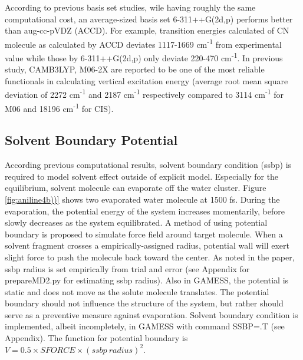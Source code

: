 \documentclass[
journal=jpcbfk, %
manuscript=article]{achemso}
\begin{document}
According to previous basis set studies, wile having roughly the same computational cost, an average-sized basis set 6-311++G(2d,p) performs better than aug-cc-pVDZ (ACCD).\cite{Wiberg2004,Barnes2014} For example, transition energies calculated of CN molecule as calculated by ACCD deviates 1117-1669 cm\textsuperscript{-1} from experimental value while those by 6-311++G(2d,p) only deviate 220-470 cm\textsuperscript{-1}. In previous study, CAMB3LYP, M06-2X are reported to be one of the most reliable functionals in calculating vertical excitation energy (average root mean square deviation of 2272 cm\textsuperscript{-1}  and 2187 cm\textsuperscript{-1}  respectively compared to 3114 cm\textsuperscript{-1} for M06 and 18196 cm\textsuperscript{-1} for CIS).\cite{Barnes2014} 

\subsection{Solvent Boundary Potential}
According previous computational results, solvent boundary condition (ssbp) is required to model solvent effect outside of explicit model. Especially for the equilibrium, solvent molecule can evaporate off the water cluster. Figure \ref{fig:aniline4b))} shows two evaporated water molecule at 1500 fs. During the evaporation, the potential energy of the system increases momentarily, before slowly decreases as the system equilibrated. A method of using potential boundary is proposed to simulate force field around target molecule. When a solvent fragment crosses a empirically-assigned radius, potential wall will exert slight force to push the molecule back toward the center.\cite{Beglov1994} As noted in the paper, ssbp radius is set empirically from trial and error (see Appendix for prepareMD2.py for estimating ssbp radius). Also in GAMESS, the potential is static and does not move as the solute molecule translates. The potential boundary should not influence the structure of the system, but rather should serve as a preventive measure against evaporation. Solvent boundary condition is implemented, albeit incompletely, in GAMESS with command SSBP=.T (see Appendix). The function for potential boundary is \(V=0.5\times SFORCE\times (ssbp\ radius)^{2}\).
\end{document}
